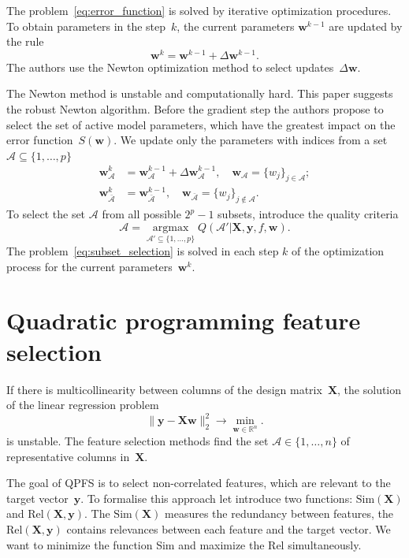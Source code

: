 \documentclass[a4paper,12pt]{article}
\theoremstyle{plain} %
\theoremstyle{definition} %
\theoremstyle{remark} %
\newcommand{\bw}{\mathbf{w}}
\newcommand{\by}{\mathbf{y}}
\newcommand{\cA}{\mathcal{A}}
\newcommand{\bbR}{\mathbb{R}}
\newcommand{\bX}{\mathbf{X}}
\newcommand{\argmax}{\mathop{\arg \max}\limits}
\begin{document}
	The problem~\eqref{eq:error_function} is solved by iterative optimization procedures. 
	To obtain parameters in the step~$k$, the current parameters $\bw^{k-1}$ are updated by the rule
	\begin{equation}
		\bw^k = \bw^{k - 1} + \Delta \bw^{k - 1}.
		\label{eq:update_rule}
	\end{equation}
	The authors use the Newton optimization method to select  updates~$\Delta \bw$.
	
	The Newton method is unstable and computationally hard. 
	This paper suggests the robust Newton algorithm. 
	Before the gradient step the authors propose to select the set of active model parameters, which have the greatest impact on the error function~$S(\bw)$.
	We update only the parameters with indices from a set $\cA \subseteq \{ 1, \dots, p \}$
	\begin{align*}
	\bw_{\cA}^k &= \bw_{\cA}^{k - 1} + \Delta \bw_{\cA}^{k - 1}, \quad \bw_{\cA} = \{w_j\}_{j \in \cA}; \\
	\bw_{\bar{\cA}}^k &= \bw_{\bar{\cA}}^{k - 1}, \quad \bw_{\bar{\cA}} = \{w_j\}_{j \notin \cA}.
	\end{align*}
	To select the set $\cA$ from all possible $2^p - 1$ subsets, introduce the quality criteria 
	\begin{equation}
		\cA = \argmax_{\cA' \subseteq \{1, \dots, p\}} Q(\cA' | \bX, \by, f, \bw).
		\label{eq:subset_selection}
	\end{equation}
	The problem~\eqref{eq:subset_selection} is solved in each step $k$ of the optimization process for the current parameters~$\bw^k$.
	
	\section*{Quadratic programming feature selection}
	If there is multicollinearity between columns of the design matrix~$\bX$, the solution of the linear regression problem
	\begin{equation}
	\| \by - \bX \bw\|_2^2 \rightarrow\min_{\bw \in \bbR^{n}}.
	\label{eq:linear_regression}
	\end{equation}
	is unstable. 
	The feature selection methods find the set $\cA \in \{1, \dots, n\}$ of representative columns in~$\bX$. 
	
	The goal of QPFS is to select non-correlated features, which are relevant to the target vector~$\by$.
	To formalise this approach let introduce two functions: $\text{Sim}(\bX)$ and $\text{Rel}(\bX, \by)$. 
	The $\text{Sim}(\bX)$ measures the redundancy between features, the $\text{Rel}(\bX, \by)$ contains relevances between each feature and the target vector. 
	We want to minimize the function Sim and maximize the Rel simultaneously.
	
\end{document}
